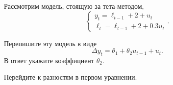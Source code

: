 
\begin{question}
Рассмотрим модель, стоящую за тета-методом,
\[
\begin{cases}
y_t = \ell_{t-1} + 2 + u_t \\
\ell_t = \ell_{t-1} + 2 + 0.3 u_t
\end{cases}.
\]

Перепишите эту модель в виде
\[
\Delta y_t = \theta_1 + \theta_2 u_{t-1} + u_t.
\]
В ответ укажите коэффициент \(\theta_2\).
\end{question}

\begin{solution}
Перейдите к разностям в первом уравнении.
\end{solution}

